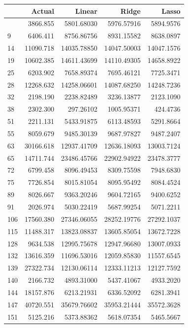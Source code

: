 \documentclass[
  12pt,
]{article}
\begin{document}
\begin{longtable}[]{@{}lrrrr@{}}
\toprule\noalign{}
& Actual & Linear & Ridge & Lasso \\
\midrule\noalign{}
\endhead
\bottomrule\noalign{}
\endlastfoot
5 & 3866.855 & 5801.68030 & 5976.57916 & 5894.9576 \\
9 & 6406.411 & 8756.86756 & 8931.15582 & 8638.0897 \\
14 & 11090.718 & 14035.78850 & 14047.50003 & 14047.1576 \\
19 & 10602.385 & 14611.43699 & 14110.49305 & 14658.8922 \\
25 & 6203.902 & 7658.89374 & 7695.46121 & 7725.3471 \\
28 & 12268.632 & 14258.06601 & 14087.68250 & 14248.7236 \\
32 & 2198.190 & 2238.82489 & 3236.13877 & 2123.1090 \\
38 & 2302.300 & 297.26102 & 1005.95371 & 424.4736 \\
51 & 2211.131 & 5433.91875 & 6113.48593 & 5291.8664 \\
55 & 8059.679 & 9485.30139 & 9687.97827 & 9487.2407 \\
63 & 30166.618 & 12937.41709 & 12636.18093 & 13003.7124 \\
65 & 14711.744 & 23486.45766 & 22902.94922 & 23478.3777 \\
72 & 6799.458 & 8096.49453 & 8309.75598 & 7948.6830 \\
75 & 7726.854 & 8015.81054 & 8095.95492 & 8084.4524 \\
89 & 8026.667 & 9363.20246 & 9604.72165 & 9400.6252 \\
91 & 2026.974 & 5030.22419 & 5687.99254 & 5071.2211 \\
106 & 17560.380 & 27346.06055 & 28252.19776 & 27292.1037 \\
115 & 11488.317 & 13823.08837 & 13605.85054 & 13672.7228 \\
128 & 9634.538 & 12995.75678 & 12947.96680 & 13007.0933 \\
132 & 13616.359 & 11696.53016 & 12059.85830 & 11557.6545 \\
139 & 27322.734 & 12130.06114 & 12333.11213 & 12127.7592 \\
140 & 2166.732 & 4893.31000 & 5437.41067 & 4933.2020 \\
144 & 18157.876 & 6213.21931 & 6336.52092 & 6281.3941 \\
147 & 40720.551 & 35679.76602 & 35953.21444 & 35572.3628 \\
151 & 5125.216 & 5373.88362 & 5618.07354 & 5465.5667 \\

\end{longtable}
\end{document}
